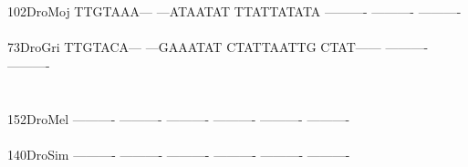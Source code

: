 \documentclass[11pt,twoside,reqno,a4paper]{article}
\begin{document}
{102\hspace*{2\charwidth}DroMoj	TTGTAAA---	---ATAATAT	TTATTATATA	----------	----------	----------	\\
\hspace*{5\charwidth}\hspace*{7\charwidth}\hspace*{1\charwidth}\hspace*{1\charwidth}\hspace*{1\charwidth}\hspace*{1\charwidth}\hspace*{1\charwidth}\hspace*{1\charwidth}\\
73\hspace*{3\charwidth}DroGri	TTGTACA---	---GAAATAT	CTATTAATTG	CTAT------	----------	----------	\\
\hspace*{5\charwidth}\hspace*{7\charwidth}\hspace*{1\charwidth}\hspace*{1\charwidth}\hspace*{1\charwidth}\hspace*{1\charwidth}\hspace*{1\charwidth}\hspace*{1\charwidth}\\
\\
152\hspace*{2\charwidth}DroMel	----------	----------	----------	----------	----------	----------	\\
\hspace*{5\charwidth}\hspace*{7\charwidth}\hspace*{1\charwidth}\hspace*{1\charwidth}\hspace*{1\charwidth}\hspace*{1\charwidth}\hspace*{1\charwidth}\hspace*{1\charwidth}\\
140\hspace*{2\charwidth}DroSim	----------	----------	----------	----------	----------	----------	\\
\hspace*{5\charwidth}\hspace*{7\charwidth}\hspace*{1\charwidth}\hspace*{1\charwidth}\hspace*{1\charwidth}\hspace*{1\charwidth}\hspace*{1\charwidth}\hspace*{1\charwidth}\\
}
\end{document}
